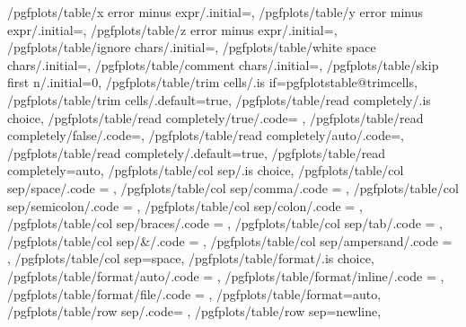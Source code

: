 {	/pgfplots/table/x error minus expr/.initial=,
	/pgfplots/table/y error minus expr/.initial=,
	/pgfplots/table/z error minus expr/.initial=,
	/pgfplots/table/ignore chars/.initial=,
	/pgfplots/table/white space chars/.initial=,
	/pgfplots/table/comment chars/.initial=,
	/pgfplots/table/skip first n/.initial=0,
	/pgfplots/table/trim cells/.is if=pgfplotstable@trimcells,
	/pgfplots/table/trim cells/.default=true,
	/pgfplots/table/read completely/.is choice,
	/pgfplots/table/read completely/true/.code=	\pgfplots@addplotimpl@readcompletelytrue\def\pgfplots@addplotimpl@readcompletely@auto{0},
	/pgfplots/table/read completely/false/.code=\pgfplots@addplotimpl@readcompletelyfalse\def\pgfplots@addplotimpl@readcompletely@auto{0},
	/pgfplots/table/read completely/auto/.code=\pgfplots@addplotimpl@readcompletelyfalse\def\pgfplots@addplotimpl@readcompletely@auto{1},
	/pgfplots/table/read completely/.default=true,
	/pgfplots/table/read completely=auto,
	/pgfplots/table/col sep/.is choice,
	/pgfplots/table/col sep/space/.code		= {\def\pgfplotstableread@COLSEP@CASE{0}},
	/pgfplots/table/col sep/comma/.code		= {\def\pgfplotstableread@COLSEP@CASE{1}},
	/pgfplots/table/col sep/semicolon/.code	= {\def\pgfplotstableread@COLSEP@CASE{2}},
	/pgfplots/table/col sep/colon/.code		= {\def\pgfplotstableread@COLSEP@CASE{3}},
	/pgfplots/table/col sep/braces/.code	= {\def\pgfplotstableread@COLSEP@CASE{4}},
	/pgfplots/table/col sep/tab/.code		= {\def\pgfplotstableread@COLSEP@CASE{5}},
	/pgfplots/table/col sep/&/.code			= {\def\pgfplotstableread@COLSEP@CASE{6}\pgfplotstable@trimcellstrue},
	/pgfplots/table/col sep/ampersand/.code	= {\def\pgfplotstableread@COLSEP@CASE{6}\pgfplotstable@trimcellstrue},
	/pgfplots/table/col sep=space,
	/pgfplots/table/format/.is choice,
	/pgfplots/table/format/auto/.code		= {\def\pgfplotstableread@FORMAT@CASE{0}},
	/pgfplots/table/format/inline/.code		= {\def\pgfplotstableread@FORMAT@CASE{1}},
	/pgfplots/table/format/file/.code		= {\def\pgfplotstableread@FORMAT@CASE{2}},
	/pgfplots/table/format=auto,
	/pgfplots/table/row sep/.code={%
	},%
	/pgfplots/table/row sep=newline,
}

